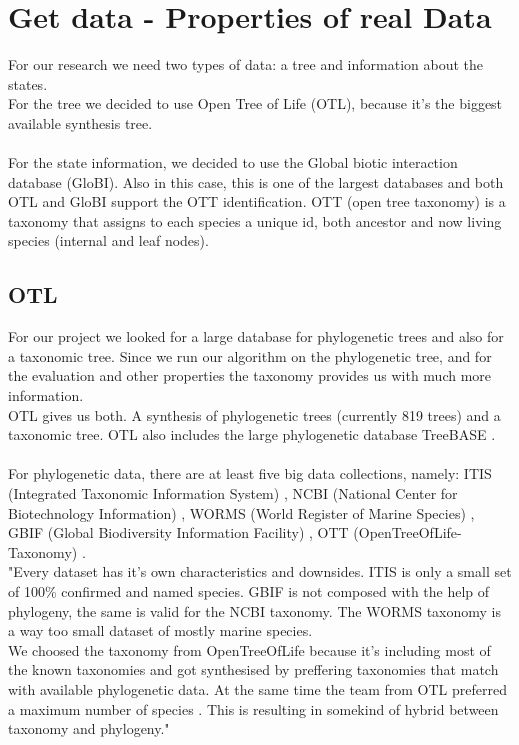   \section{Get data - Properties of real Data}
    For our research we need two types of data: a tree and information about the states. \\
    For the tree we decided to use Open Tree of Life (OTL), because it's the biggest available synthesis 
      tree. \\
     \\
    For the state information, we decided to use the Global biotic interaction database (GloBI). Also in 
      this case, this is one of the largest databases and both OTL and GloBI support the OTT 
      identification. OTT (open tree taxonomy) is a taxonomy that assigns to each species a unique id, 
      both ancestor and now living species (internal and leaf nodes).

    \subsection{OTL}
      For our project we looked for a large database for phylogenetic trees and also for a taxonomic 
        tree. Since we run our algorithm on the phylogenetic tree, and for the evaluation and other 
        properties the taxonomy provides us with much more information. \\
      OTL gives us both. A synthesis of phylogenetic trees (currently 819 trees) and a taxonomic tree. 
        OTL also includes the large phylogenetic database TreeBASE \cite{Hinchliff2015}. \\
       \\
      For phylogenetic data, there are at least five big data collections, namely: ITIS (Integrated 
        Taxonomic Information System) \cite{ITIS}, NCBI (National Center for Biotechnology Information) 
        \cite{NCBI1988}, WORMS (World Register of Marine Species) \cite{WoRMS2018}, GBIF (Global 
        Biodiversity Information Facility) \cite{GBIF}, OTT (OpenTreeOfLife-Taxonomy) 
        \cite{Hinchliff2015}. \\
       "Every dataset has it's own characteristics and downsides. ITIS is only a small 
        set of 100\% confirmed and named species. GBIF is not composed with the help of phylogeny, the 
        same is valid for the NCBI taxonomy. The WORMS taxonomy is a way too small dataset of mostly 
        marine species. \\
      We choosed the taxonomy from OpenTreeOfLife because it's including most of the known taxonomies 
        and got synthesised by preffering taxonomies that match with available phylogenetic data. At the 
        same time the team from OTL preferred a maximum number of species \cite{Hinchliff2015}. This is 
        resulting in somekind of hybrid between taxonomy and phylogeny." \\

